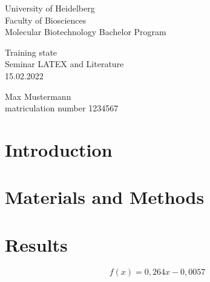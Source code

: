 \documentclass[a4paper,12pt]{report}
\begin{document}
\onehalfspacing
{}
	
\begin{titlepage}
	\begin{flushleft}University of Heidelberg\\
	 Faculty of Biosciences\\
	 Molecular Biotechnology Bachelor Program\\
	\end{flushleft}
\vspace*{6.5cm}
	\begin{center}
		\huge Training state\\ \bigskip
    	\Large Seminar LATEX and Literature\\ \smallskip
    	\large 15.02.2022
    	\normalsize
	\end{center}
\vspace*{\fill}
	\begin{flushright} 
	\large Max Mustermann\\ \normalsize
	matriculation number 1234567
	\end{flushright}
\end{titlepage}

\tableofcontents
{}

\newpage


\onehalfspacing
{}
\chapter{Introduction}
\blindtext



\chapter{Materials and Methods}
\lipsum[2-5]


\chapter{Results}

\lipsum[3]

\begin{equation*}
	f(x) = 0,264x - 0,0057
\end{equation*}
\end{document}
